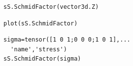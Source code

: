 \documentclass[compress]{beamer}
\begin{document}
\begin{frame}[fragile]
\begin{columns}
\begin{column}{8cm}
\begin{overlayarea}{\textwidth}{8cm}
        \pause

        \vspace{-0.1cm}
  \begin{lstlisting}[style=input]
sS.SchmidFactor(vector3d.Z)
\end{lstlisting}

\pause

\vspace{-0.1cm}
\begin{lstlisting}[style=input]
plot(sS.SchmidFactor)
\end{lstlisting}

\pause

\vspace{-0.1cm}
\begin{lstlisting}[style=input]
sigma=tensor([1 0 1;0 0 0;1 0 1],...
  'name','stress')
sS.SchmidFactor(sigma)
\end{lstlisting}


\end{overlayarea}
\end{column}
\begin{column}{4cm}
\end{column}
\end{columns}



\end{frame}
\end{document}
